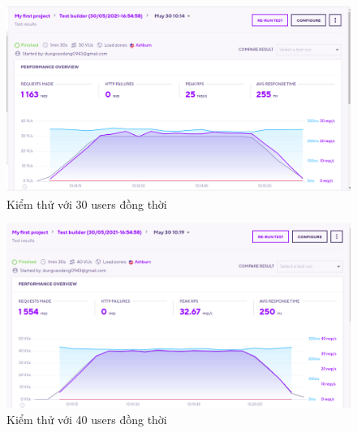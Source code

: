 		\begin{figure}[H]
			\includegraphics[width=1\textwidth]{Images/testing/testing_30.png}
			\centering
			\linebreak
			\caption{Kiểm thử với 30 users đồng thời}
		\end{figure}
		\begin{figure}[H]
			\includegraphics[width=1\textwidth]{Images/testing/testing_40.png}
			\centering
			\linebreak
			\caption{Kiểm thử với 40 users đồng thời}
		\end{figure}
	
